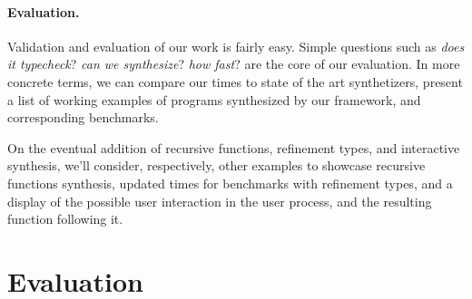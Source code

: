 \documentclass{llncs}
\newcommand{\lolli}{\multimap}
\newcommand{\tensor}{\otimes}
\newcommand{\bang}{{!}}
\newcommand{\mypara}[1]{\paragraph{\textbf{#1}.}}
\begin{document}
\mypara{Evaluation} Validation and evaluation of our work is fairly
easy. Simple questions such as \emph{does it typecheck}? \emph{can
  we synthesize}? \emph{how fast}?  are the core of our evaluation. In
more concrete terms, we can compare our times to state of the art
synthetizers, present a list of working examples of programs synthesized
by our framework, and corresponding benchmarks.

On the eventual addition of recursive functions, refinement types, and
interactive synthesis, we'll consider, respectively, other examples to
showcase recursive functions synthesis, updated times for benchmarks
with refinement types, and a display of the possible user interaction
in the user process, and the resulting function following it.






\section{Evaluation}





\end{document}
